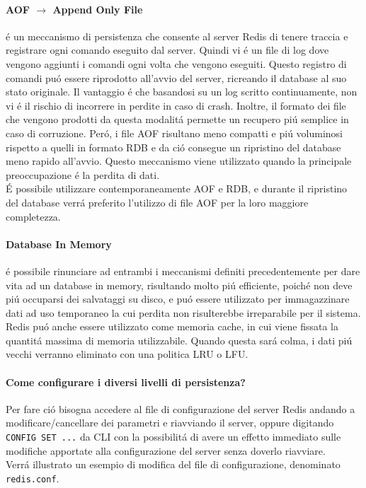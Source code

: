 \begin{itemize}
    \paragraph{AOF $\to$ Append Only File}
    é un meccanismo di persistenza che consente al server Redis di tenere traccia e registrare ogni comando eseguito dal server.
    Quindi vi é un file di log dove vengono aggiunti i comandi ogni volta che vengono eseguiti.
    Questo registro di comandi puó essere riprodotto all'avvio del server, ricreando il database al suo stato originale.
    Il vantaggio é che basandosi su un log scritto continuamente, non vi é il rischio di incorrere in perdite in caso di crash. Inoltre,
    il formato dei file che vengono prodotti da questa modalitá permette un recupero piú semplice in caso di corruzione.
    Peró, i file AOF risultano meno compatti e piú voluminosi rispetto a quelli in formato RDB e da ció consegue un ripristino del database
    meno rapido all'avvio. Questo meccanismo viene utilizzato quando la principale preoccupazione é la perdita di dati.\\

    É possibile utilizzare contemporaneamente AOF e RDB, e durante il ripristino del database verrá preferito l'utilizzo di file AOF per la loro
    maggiore completezza.


    \paragraph{Database In Memory}
    é possibile rinunciare ad entrambi i meccanismi definiti precedentemente per dare vita ad un database in memory, risultando molto piú
    efficiente, poiché non deve piú occuparsi dei salvataggi su disco, e puó essere utilizzato per immagazzinare dati ad uso temporaneo la cui
    perdita non risulterebbe irreparabile per il sistema.\\
    Redis puó anche essere utilizzato come memoria cache, in cui viene fissata la quantitá massima di memoria utilizzabile. Quando questa sará
    colma, i dati piú vecchi verranno eliminato con una politica LRU o LFU.
\end{itemize}

\paragraph{Come configurare i diversi livelli di persistenza?\\}
Per fare ció bisogna accedere al file di configurazione del server Redis andando a modificare/cancellare dei parametri e riavviando il server,
oppure digitando \texttt{CONFIG SET ...} da CLI con la possibilitá di avere un effetto immediato sulle modifiche apportate alla configurazione del server senza doverlo riavviare.\\
Verrá illustrato un esempio di modifica del file di configurazione, denominato \texttt{redis.conf}.\\

